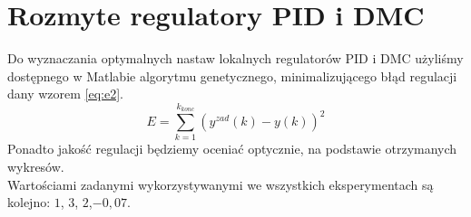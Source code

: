 \chapter{Rozmyte regulatory PID i DMC}
Do wyznaczania optymalnych nastaw lokalnych regulatorów PID i DMC użyliśmy dostępnego w Matlabie algorytmu genetycznego, minimalizującego błąd regulacji dany wzorem \ref{eq:e2}.
\begin{equation} \label{eq:e2}
E = \sum_{k=1}^{k_{konc}} (y^{zad}(k)-y(k))^2
\end{equation}
Ponadto jakość regulacji będziemy oceniać optycznie, na podstawie otrzymanych wykresów. \\
Wartościami zadanymi wykorzystywanymi we wszystkich eksperymentach są kolejno: $1$, $3$, $2$,$-0,07$.




